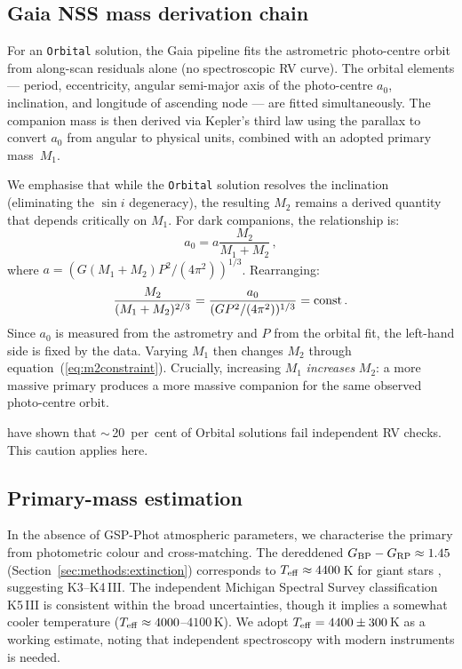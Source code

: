 \documentclass[usenatbib,fleqn]{mnras}
\begin{document}
\subsection{Gaia NSS mass derivation chain}
\label{sec:methods:nss}

For an \texttt{Orbital} solution, the Gaia pipeline fits the
astrometric photo-centre orbit from along-scan residuals alone
(no spectroscopic RV curve).  The orbital elements --- period,
eccentricity, angular semi-major axis of the photo-centre $a_0$,
inclination, and longitude of ascending node --- are fitted
simultaneously.  The companion mass is then derived via Kepler's
third law using the parallax to convert $a_0$ from angular to
physical units, combined with an adopted primary mass~$M_1$.

We emphasise that while the \texttt{Orbital} solution resolves the
inclination (eliminating the $\sin i$ degeneracy), the resulting
$M_2$ remains a derived quantity that depends critically on $M_1$.
For dark companions, the
relationship is:
\begin{equation}
a_0 = a \frac{M_2}{M_1 + M_2} \,,
\label{eq:a0}
\end{equation}
where $a = (G(M_1 + M_2) P^2 / (4\pi^2))^{1/3}$.  Rearranging:
\begin{equation}
\frac{M_2}{(M_1 + M_2)^{2/3}} =
  \frac{a_0}{(G P^2 / (4\pi^2))^{1/3}} = {\rm const} \,.
\label{eq:m2constraint}
\end{equation}
Since $a_0$ is measured from the astrometry and $P$ from the
orbital fit, the left-hand side is fixed by the data.  Varying
$M_1$ then changes $M_2$ through equation~(\ref{eq:m2constraint}).
Crucially, increasing $M_1$ \emph{increases} $M_2$: a more massive
primary produces a more massive companion for the same observed
photo-centre orbit.

\citet{ElBadry2024} have shown that $\sim$\,20~per~cent of Orbital
solutions fail independent RV checks.  This caution applies here.

\subsection{Primary-mass estimation}
\label{sec:methods:m1}

In the absence of GSP-Phot atmospheric parameters, we characterise
the primary from photometric colour and cross-matching.
The dereddened
$G_{\rm BP} - G_{\rm RP} \approx 1.45$
(Section~\ref{sec:methods:extinction})
corresponds to $T_{\rm eff} \approx 4400$\,K for giant stars
\citep{PecautMamajek2013, Andrae2023}, suggesting K3--K4\,III.
The independent Michigan Spectral Survey classification
K5\,III \citep{Houk1978} is consistent within the broad
uncertainties, though it implies a somewhat cooler temperature
($T_{\rm eff} \approx 4000$--$4100$\,K).  We adopt
$T_{\rm eff} = 4400 \pm 300$\,K as a working estimate, noting
that independent spectroscopy with modern instruments is needed.
\end{document}
